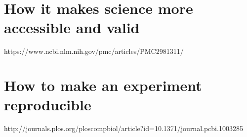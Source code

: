 \section{How it makes science more accessible and valid}
https://www.ncbi.nlm.nih.gov/pmc/articles/PMC2981311/
\section{How to make an experiment reproducible}
http://journals.plos.org/ploscompbiol/article?id=10.1371/journal.pcbi.1003285
\fi

